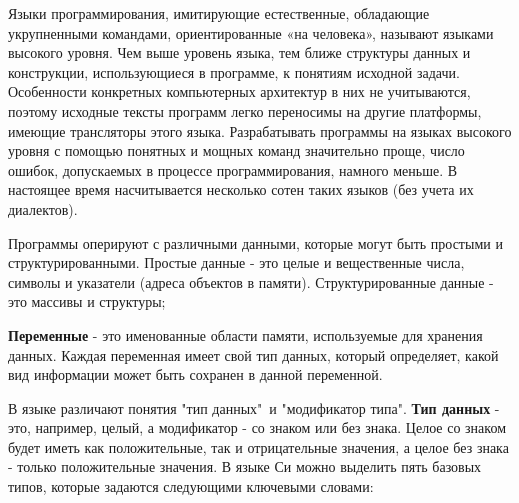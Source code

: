 \documentclass[a4paper, fontsize=10bp]{article} %
\begin{document}
Языки программирования, имитирующие естественные, обладающие укрупненными командами, ориентированные 
«на человека», называют языками высокого уровня. Чем выше уровень языка, тем ближе структуры данных 
и конструкции, использующиеся в программе, к понятиям исходной задачи. Особенности конкретных 
компьютерных архитектур в них не учитываются, поэтому исходные тексты программ легко переносимы на 
другие платформы, имеющие трансляторы этого языка. Разрабатывать программы на языках высокого уровня 
с помощью понятных и мощных команд значительно проще, число ошибок, допускаемых в процессе 
программирования, намного меньше. В настоящее время насчитывается несколько сотен таких языков 
(без учета их диалектов).

Программы оперируют с различными данными, которые могут быть простыми и структурированными. Простые 
данные - это целые и вещественные числа, символы и указатели (адреса объектов в памяти). 
Структурированные данные - это массивы и структуры;

{\bfseries Переменные} - это именованные области памяти, используемые для хранения данных. Каждая 
переменная имеет свой тип данных, который определяет, какой вид информации может быть сохранен в данной
переменной.

В языке различают понятия "тип данных"\  и "модификатор типа". {\bfseries Тип данных} - это, например, 
целый, а модификатор - со знаком или без знака. Целое со знаком будет иметь как положительные, так и 
отрицательные значения, а целое без знака - только положительные значения. В языке Си можно выделить пять 
базовых типов, которые задаются следующими ключевыми словами:
\end{document}
